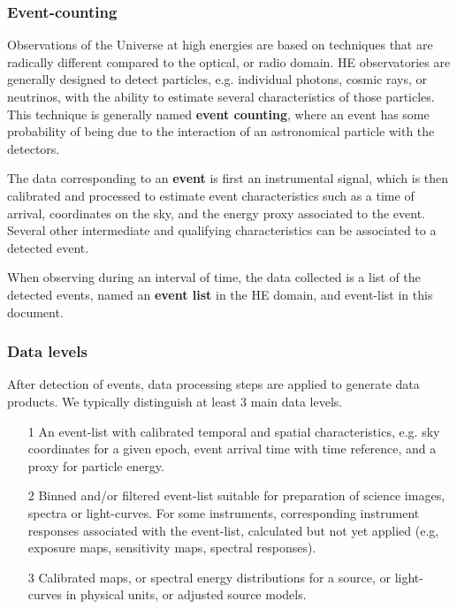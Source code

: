 \documentclass[11pt,a4paper]{ivoa}
\begin{document}
\subsubsection{Event-counting}

Observations of the Universe at high energies are based on techniques that are radically different compared to the optical, or radio domain. \gls{HE} observatories are generally designed to detect particles, e.g. individual photons, cosmic rays, or neutrinos, with the ability to estimate several characteristics of those particles. This technique is generally named \textbf{event counting}, where an event has some probability of being due to the interaction of an astronomical particle with the detectors.

The data corresponding to an \textbf{event} is first an instrumental signal, which is then calibrated and processed to estimate event characteristics such as a time of arrival, coordinates on the sky, and the energy proxy associated to the event. Several other intermediate and qualifying characteristics can be associated to a detected event.

When observing during an interval of time, the data collected is a list of the detected events, named an \textbf{event list} in the \gls{HE} domain, and event-list in this document.




\subsubsection{Data levels}\label{sec:datalevels}

After detection of events, data processing steps are applied to generate data products. We typically distinguish at least 3 main data levels.

\begin{itemize}
    \item[1] An event-list with calibrated temporal and spatial characteristics, e.g. sky coordinates for a given epoch, event arrival time with time reference, and a proxy for particle energy.
    \item[2] Binned and/or filtered event-list suitable for preparation of science images, spectra or light-curves.  For some instruments, corresponding instrument responses associated with the event-list, calculated but not yet applied (e.g, exposure maps, sensitivity maps, spectral responses).
    \item[3] Calibrated maps, or spectral energy distributions for a source, or light-curves in physical units, or adjusted source models.
\end{itemize}
\end{document}
